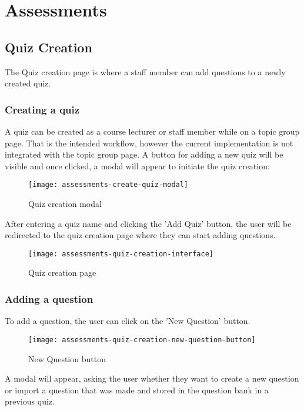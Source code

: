 \section{Assessments}

\subsection{Quiz Creation}
The Quiz creation page is where a staff member can add questions to a newly created quiz.

\subsubsection{Creating a quiz}
A quiz can be created as a course lecturer or staff member while on a topic group page. That is the intended workflow, however the current implementation is not integrated with the topic group page. A button for adding a new quiz will be visible and once clicked, a modal will appear to initiate the quiz creation:

\begin{figure}[!hbpt]
	\centering
	\texttt{[image: assessments-create-quiz-modal]}
	\caption{Quiz creation modal}
\end{figure}

After entering a quiz name and clicking the 'Add Quiz' button, the user will be redirected to the quiz creation page where they can start adding questions.


\begin{figure}[!hbpt]
	\centering
	\texttt{[image: assessments-quiz-creation-interface]}
	\caption{Quiz creation page}
\end{figure}


\subsubsection{Adding a question}
To add a question, the user can click on the 'New Question' button.

\begin{figure}[!hbpt]
	\centering
	\texttt{[image: assessments-quiz-creation-new-question-button]}
	\caption{New Question button}
\end{figure}

A modal will appear, asking the user whether they want to create a new question or import a question that was made and stored in the question bank in a previous quiz. 

